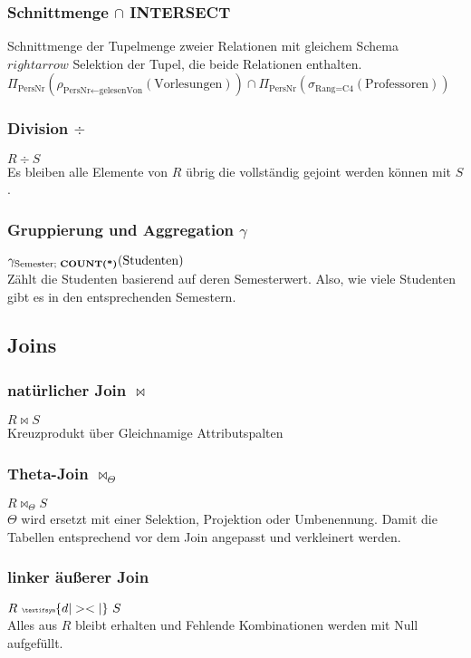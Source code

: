 \subsubsection{Schnittmenge $\cap$ INTERSECT}
Schnittmenge der Tupelmenge zweier Relationen mit gleichem Schema $rightarrow$ Selektion der Tupel, die beide Relationen enthalten.\\
$\Pi_{\text{PersNr}}(\rho_{\text{PersNr}\leftarrow\text{gelesenVon}}(\text{Vorlesungen}))\cap\Pi_{\text{PersNr}}(\sigma_{\text{Rang}=\text{C4}}(\text{Professoren}))$

\subsubsection{Division $\div$ }
$R\div S$ \\
Es bleiben alle Elemente von $R$ übrig die vollständig gejoint werden können mit $S$.

\subsubsection{Gruppierung und Aggregation $\gamma$}
$\gamma_{\text{Semester; \textbf{COUNT(*)}}}(\text{Studenten})$\\
Zählt die Studenten basierend auf deren Semesterwert. Also, wie viele Studenten gibt es in den entsprechenden Semestern. 

\subsection{Joins}
\subsubsection{natürlicher Join $\bowtie$}
$R \bowtie S$\\
Kreuzprodukt über Gleichnamige Attributspalten
\subsubsection{Theta-Join $\bowtie_{\Theta}$}
$R \bowtie_{\Theta} S$\\
$\Theta$ wird ersetzt mit einer Selektion, Projektion oder Umbenennung. Damit die Tabellen entsprechend vor dem Join angepasst und verkleinert werden. 
\subsubsection{linker äußerer Join}
$R ~{\tiny \textifsym{d|><|}}~ S$\\
Alles aus $R$ bleibt erhalten und Fehlende Kombinationen werden mit Null aufgefüllt. 
